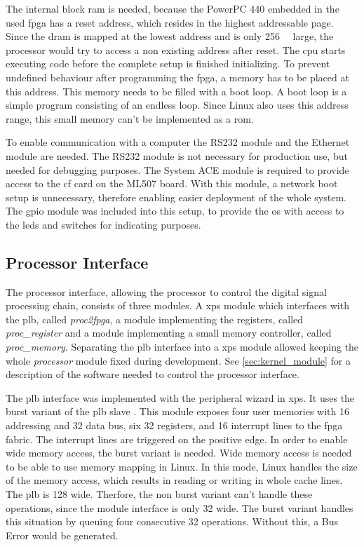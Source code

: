 \documentclass[12pt,a4paper,parskip=full,abstract=true,BCOR=12mm,twoside,open=right]{scrreprt}
\def\device#1{\textit{#1}}
\begin{document}
The internal block \gls{ram} is needed, because the PowerPC 440 embedded
in the used \gls{fpga} has a reset address, which resides in the highest
addressable page\cite{ppc}. Since the \gls{dram} is mapped at the lowest address
and is only \SI{256}{\mebi\byte} large\cite{ml507}, the processor would try to access
a non existing address after reset. The \gls{cpu} starts
executing code before the complete setup is finished initializing. To prevent undefined
behaviour after programming the \gls{fpga}, a memory has to be placed at
this address. This memory needs to be filled with a boot loop. A boot
loop is a simple program consisting of an endless loop. Since Linux
also uses this address range, this small memory can't be implemented
as a \gls{rom}.

To enable communication with a computer the RS232 module and the Ethernet
module are needed. The RS232 module is not necessary for production use,
but needed for debugging purposes. The System ACE module is required to
provide access to the \gls{cf} card on the ML507 board. With this module,
a network boot setup is unnecessary, therefore enabling easier deployment
of the whole system. The \gls{gpio} module was included into this setup,
to provide the \gls{os} with access to the \glspl{led} and switches for
indicating purposes.


\subsection{Processor Interface}
\label{sec:processor_interface}

The processor interface, allowing the processor to control the digital
signal processing chain, consists of three modules. A \gls{xps} module which
interfaces with the \gls{plb}, called \device{proc2fpga}, a module
implementing the registers, called \device{proc\_register} and a module
implementing a small memory controller, called \device{proc\_memory}. Separating
the \gls{plb} interface into a \gls{xps} module allowed keeping the whole
\device{processor} module fixed during development. See \cref{sec:kernel_module}
for a description of the software needed to control the processor interface.

The \gls{plb} interface was implemented with the peripheral wizard in \gls{xps}.
It uses the burst variant of the \gls{plb} slave \cite{slave_burst}. This module
exposes four user memories with \SI{16}{\bit} addressing and \SI{32}{\bit} data
bus, six \SI{32}{\bit} registers, and 16 interrupt lines to the \gls{fpga} fabric.
The interrupt lines are triggered on the positive edge. In order to enable wide
memory access, the burst variant is needed. Wide memory access is needed
to be able to use memory mapping in Linux. In this mode, Linux handles the
size of the memory access, which results in reading or writing in whole
cache lines. The \gls{plb} is \SI{128}{\bit} wide. Therfore, the non burst variant
can't handle these operations, since the module interface is only \SI{32}{\bit}
wide. The burst variant handles this situation by queuing four consecutive
\SI{32}{\bit} operations. Without this, a Bus Error would be generated.
\end{document}
